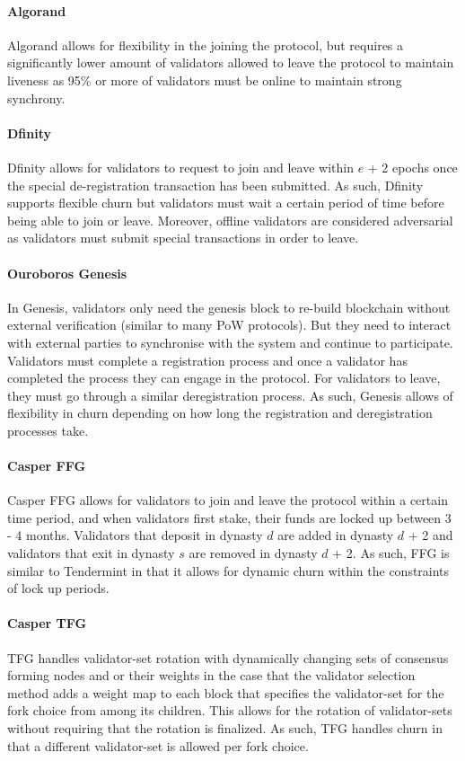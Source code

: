 \documentclass[10pt,journal,compsoc]{IEEEtran}
\begin{document}
\paragraph{Algorand} Algorand allows for flexibility in the joining the protocol, but requires a significantly lower amount of validators allowed to leave the protocol to maintain liveness as 95\% or more of validators must be online to maintain strong synchrony.

\paragraph{Dfinity} Dfinity allows for validators to request to join and leave within $e$ + 2 epochs once the special de-registration transaction has been submitted. As such, Dfinity supports flexible churn but validators must wait a certain period of time before being able to join or leave. Moreover, offline validators are considered adversarial as validators must submit special transactions in order to leave. 

\paragraph{Ouroboros Genesis} In Genesis, validators only need the genesis block to re-build blockchain without external verification (similar to many PoW protocols). But they need to interact with external parties to synchronise with the system and continue to participate. Validators must complete a registration process and once a validator has completed the process they can engage in the protocol. For validators to leave, they must go through a similar deregistration process. As such, Genesis allows of flexibility in churn depending on how long the registration and deregistration processes take. 

\paragraph{Casper FFG} Casper FFG allows for validators to join and leave the protocol within a certain time period, and when validators first stake, their funds are locked up between 3 - 4 months. Validators that deposit in dynasty $d$ are added in dynasty $d$ + 2 and validators that exit in dynasty $s$ are removed in dynasty $d$ + 2. As such, FFG is similar to Tendermint in that it allows for dynamic churn within the constraints of lock up periods. 

\paragraph{Casper TFG} TFG handles validator-set rotation with dynamically changing sets of consensus forming nodes and or their weights in the case that the validator selection method adds a weight map to each block that specifies the validator-set for the fork choice from among its children. This allows for the rotation of validator-sets without requiring that the rotation is finalized. As such, TFG handles churn in that a different validator-set is allowed per fork choice. 
\end{document}
